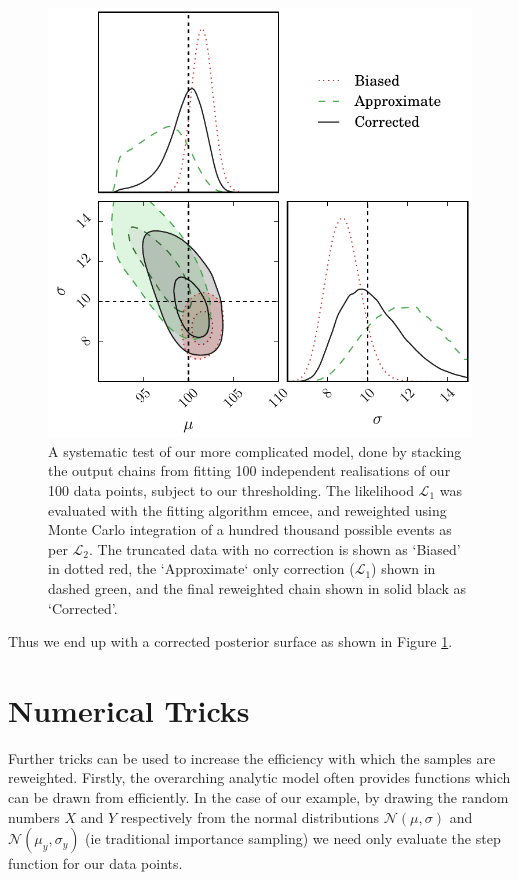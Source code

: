 \documentclass[a4paper,fleqn,usenatbib]{mnras}
\begin{document}
\begin{figure}
	\begin{center}
		\includegraphics[width=\columnwidth]{example/real.pdf}
	\end{center}
	\caption{A systematic test of our more complicated model, done by stacking the output chains from fitting 100 independent realisations of our 100 data points, subject to our thresholding. The likelihood $\mathcal{L}_1$ was evaluated with the fitting algorithm emcee, and reweighted using Monte Carlo integration of a hundred thousand possible events as per $\mathcal{L}_2$. The truncated data with no correction is shown as `Biased' in dotted red, the `Approximate` only correction ($\mathcal{L}_1$) shown in dashed green, and the final reweighted chain shown in solid black as `Corrected'.}
	\label{fig:real}
\end{figure}
Thus we end up with a corrected posterior surface as shown in Figure \ref{fig:real}.


\section{Numerical Tricks}
\label{sec:tricks}
Further tricks can be used to increase the efficiency with which the samples are reweighted. Firstly, the overarching analytic model often provides functions which can be drawn from efficiently. In the case of our example, by drawing the random numbers $X$ and $Y$ respectively from the normal distributions $\mathcal{N}(\mu,\sigma)$ and $\mathcal{N}(\mu_y,\sigma_y)$ (ie traditional importance sampling) we need only evaluate the step function for our data points.
\end{document}
